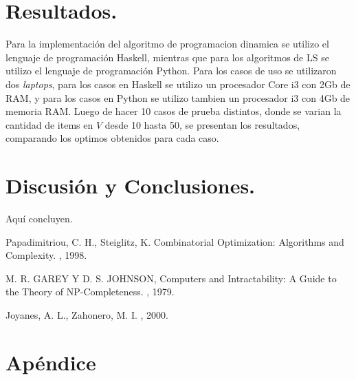 \documentclass{ci5652}
\begin{document}
\section{Resultados.}
	Para la implementación del algoritmo de programacion dinamica se utilizo el lenguaje de programación Haskell, mientras que para los algoritmos de LS se utilizo el lenguaje de programación Python. Para los casos de uso se utilizaron dos \textit{laptops}, para los casos en Haskell se utilizo un procesador Core i3 con 2Gb de RAM, y para los casos en Python se utilizo tambien un procesador i3 con 4Gb de memoria RAM. Luego de hacer 10 casos de prueba distintos, donde se varian la cantidad de items en $V$ desde 10 hasta 50, se presentan los resultados, comparando los optimos obtenidos para cada caso.\\

\section{Discusión y Conclusiones.}
	Aquí concluyen.


\small


\begin{thebibliography}{99}

Papadimitriou, C. H., Steiglitz, K. 
\newblock Combinatorial Optimization: Algorithms and Complexity. 
, 1998.


M. R. GAREY Y D. S. JOHNSON,
\newblock Computers and Intractability: A Guide to the Theory of NP-Completeness.
, 1979.

Joyanes, A. L., Zahonero, M. I. 
, 2000.

\end{thebibliography}


\newpage
\section*{Apéndice}
\end{document}

